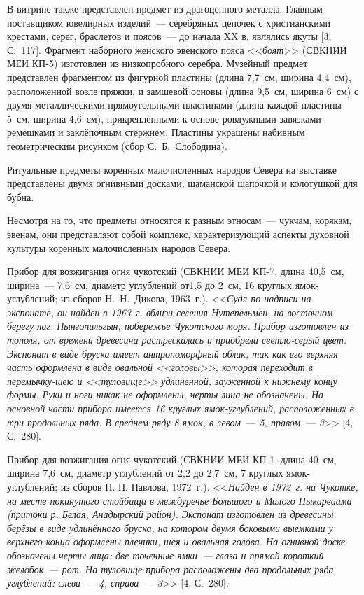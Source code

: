 В витрине также представлен предмет из драгоценного металла. Главным поставщиком ювелирных изделий~--- серебряных цепочек с христианскими крестами, серег, браслетов и поясов~--- до начала XX в. являлись якуты [3, С.~117]. Фрагмент наборного женского эвенского пояса <<\textit{боят}>> (СВКНИИ МЕИ КП-5) изготовлен из низкопробного серебра. Музейный предмет представлен фрагментом из фигурной пластины (длина 7,7~см, ширина 4,4~см), расположенной возле пряжки, и замшевой основы (длина 9,5~см, ширина 6~см) с двумя металлическими прямоугольными пластинами (длина каждой пластины 5~см, ширина 4,6~см), прикреплёнными к основе ровдужными завязками-ремешками и заклёпочным стержнем. Пластины украшены набивным геометрическим рисунком (сбор С.~Б.~Слободина).

Ритуальные предметы коренных малочисленных народов Севера на выставке представлены двумя огнивными досками, шаманской шапочкой и колотушкой для бубна.

Несмотря на то, что предметы относятся к разным этносам~--- чукчам, корякам, эвенам, они представляют собой комплекс, характеризующий аспекты духовной культуры коренных малочисленных народов Севера.

Прибор для возжигания огня чукотский (СВКНИИ МЕИ КП-7, длина 40,5~см, ширина~--- 7,6~см, диаметр углублений от1,5 до 2~см, 16 круглых ямок-углублений; из сборов Н.~Н.~Дикова, 1963~г.). <<\textit{Судя по надписи на экспонате, он найден в 1963~г. вблизи селения Нутепельмен, на восточном берегу лаг. Пынгопильгын, побережье Чукотского моря. Прибор изготовлен из тополя, от времени древесина растрескалась и приобрела светло-серый цвет. Экспонат в виде бруска имеет антропоморфный облик, так как его верхняя часть оформлена в виде овальной <<\textit{головы}>>, которая переходит в перемычку-шею и <<\textit{туловище}>> удлиненной, зауженной к нижнему концу формы. Руки и ноги никак не оформлены, черты лица не обозначены. На основной части прибора имеется 16 круглых ямок-углублений, расположенных в три продольных ряда. В среднем ряду 8 ямок, в левом~--- 5, правом~--- 3}>> [4, С.~280].

Прибор для возжигания огня чукотский (СВКНИИ МЕИ КП-1, длина 40~см, ширина 7,6~см, диаметр углублений от 2,2 до 2,7~см, 7 круглых ямок-углублений; из сборов П. П. Павлова, 1972~г.). <<\textit{Найден в 1972~г. на Чукотке, на месте покинутого стойбища в междуречье Большого и Малого Пыкарваама (притоки р. Белая, Анадырский район). Экспонат изготовлен из древесины берёзы в виде удлинённого бруска, на котором двумя боковыми выемками у верхнего конца оформлены плечики, шея и овальная голова. На огнивной доске обозначены черты лица: две точечные ямки~--- глаза и прямой короткий желобок~--- рот. На туловище прибора расположены два продольных ряда углублений: слева~--- 4, справа~--- 3}>> [4, С.~280].

